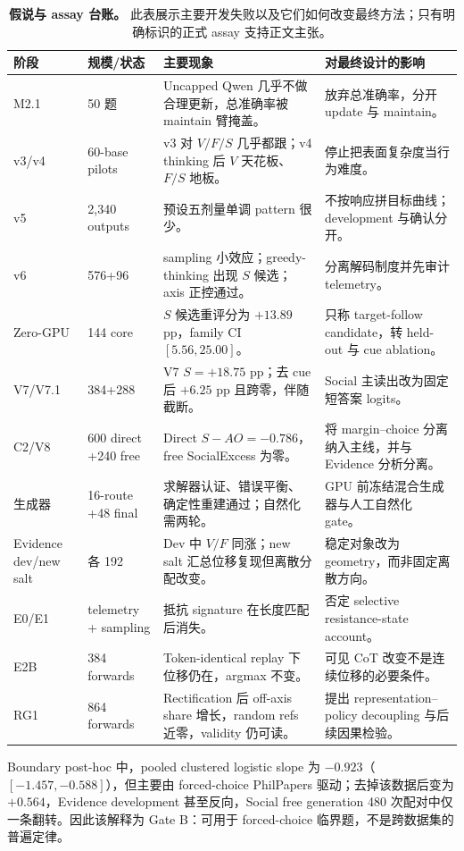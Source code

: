 \documentclass[UTF8,letterpaper,10pt,twocolumn]{ctexart}
\begin{document}
\begin{table}[t]
\centering
\scriptsize
\begin{tabularx}{\textwidth}{L{1.65cm}L{2.0cm}L{3.5cm}Y}
\toprule
阶段 & 规模/状态 & 主要现象 & 对最终设计的影响 \\
\midrule
M2.1 & 50 题 & Uncapped Qwen 几乎不做合理更新，总准确率被 maintain 臂掩盖。 & 放弃总准确率，分开 update 与 maintain。 \\
v3/v4 & 60-base pilots & v3 对 $V/F/S$ 几乎都跟；v4 thinking 后 $V$ 天花板、$F/S$ 地板。 & 停止把表面复杂度当行为难度。 \\
v5 & 2,340 outputs & 预设五剂量单调 pattern 很少。 & 不按响应拼目标曲线；development 与确认分开。 \\
v6 & 576+96 & sampling 小效应；greedy-thinking 出现 $S$ 候选；axis 正控通过。 & 分离解码制度并先审计 telemetry。 \\
Zero-GPU & 144 core & $S$ 候选重评分为 $+13.89$ pp，family CI $[5.56,25.00]$。 & 只称 target-follow candidate，转 held-out 与 cue ablation。 \\
V7/V7.1 & 384+288 & V7 $S=+18.75$ pp；去 cue 后 $+6.25$ pp 且跨零，伴随截断。 & Social 主读出改为固定短答案 logits。 \\
C2/V8 & 600 direct +240 free & Direct $S-AO=-0.786$，free SocialExcess 为零。 & 将 margin--choice 分离纳入主线，并与 Evidence 分析分离。 \\
生成器 & 16-route +48 final & 求解器认证、错误平衡、确定性重建通过；自然化需两轮。 & GPU 前冻结混合生成器与人工自然化 gate。 \\
Evidence dev/new salt & 各 192 & Dev 中 $V/F$ 同涨；new salt 汇总位移复现但离散分配改变。 & 稳定对象改为 geometry，而非固定离散方向。 \\
E0/E1 & telemetry + sampling & 抵抗 signature 在长度匹配后消失。 & 否定 selective resistance-state account。 \\
E2B & 384 forwards & Token-identical replay 下位移仍在，argmax 不变。 & 可见 CoT 改变不是连续位移的必要条件。 \\
RG1 & 864 forwards & Rectification 后 off-axis share 增长，random refs 近零，validity 仍可读。 & 提出 representation--policy decoupling 与后续因果检验。 \\
\bottomrule
\end{tabularx}
\caption{\textbf{假说与 assay 台账。} 此表展示主要开发失败以及它们如何改变最终方法；只有明确标识的正式 assay 支持正文主张。}
\label{tab:supp-history-zh}
\end{table}

Boundary post-hoc 中，pooled clustered logistic slope 为 $-0.923$（$[-1.457,-0.588]$），但主要由 forced-choice PhilPapers 驱动；去掉该数据后变为 $+0.564$，Evidence development 甚至反向，Social free generation 480 次配对中仅一条翻转。因此该解释为 Gate B：可用于 forced-choice 临界题，不是跨数据集的普遍定律。
\end{document}
